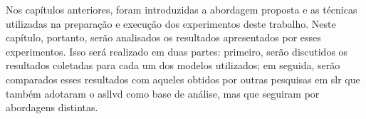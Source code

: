Nos capítulos anteriores, foram introduzidas a abordagem proposta e as técnicas utilizadas na preparação e execução dos experimentos deste trabalho.
Neste capítulo, portanto, serão analisados os resultados apresentados por esses experimentos.
Isso será realizado em duas partes: 
primeiro, serão discutidos os resultados coletadas para cada um dos modelos utilizados; em seguida, serão comparados esses resultados com aqueles obtidos por outras pesquisas em \acrfull{slr} que também adotaram o \acrfull{asllvd} como base de análise, mas que seguiram por abordagens distintas.
